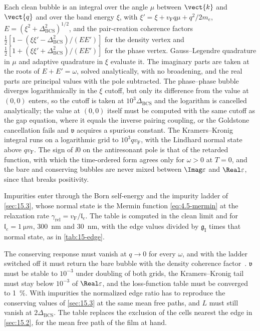 Each clean bubble is an integral over the angle $\mu$ between $\vect{k}$ and $\vect{q}$ and over the band energy $\xi$, with $\xi' = \xi + v_{\mathrm{F}}q\mu + q^2/2m_e$, $E = (\xi^2 + \Delta_{\mathrm{BCS}}^2)^{1/2}$, and the pair-creation coherence factors $\frac12[1 - (\xi\xi' - \Delta_{\mathrm{BCS}}^2)/(EE')]$ for the density vertex and $\frac12[1 + (\xi\xi' + \Delta_{\mathrm{BCS}}^2)/(EE')]$ for the phase vertex. Gauss--Legendre quadrature in $\mu$ and adaptive quadrature in $\xi$ evaluate it. The imaginary parts are taken at the roots of $E + E' = \omega$, solved analytically, with no broadening, and the real parts are principal values with the pole subtracted. The phase--phase bubble diverges logarithmically in the $\xi$ cutoff, but only its difference from the value at $(0,0)$ enters, so the cutoff is taken at $10^3\Delta_{\mathrm{BCS}}$ and the logarithm is cancelled analytically; the value at $(0,0)$ itself must be computed with the same cutoff as the gap equation, where it equals the inverse pairing coupling, or the Goldstone cancellation fails and $\mathfrak{v}$ acquires a spurious constant. The Kramers--Kronig integral runs on a logarithmic grid to $10^3qv_{\mathrm{F}}$, with the Lindhard normal state above $qv_{\mathrm{F}}$. The sign of $\ii0$ on the antiresonant pole is that of the retarded function, with which the time-ordered form agrees only for $\omega > 0$ at $T = 0$, and the bare and conserving bubbles are never mixed between $\Imag\varepsilon$ and $\Real\varepsilon$, since that breaks positivity.

Impurities enter through the Born self-energy and the impurity ladder of \cref{sec:15.3}, whose normal state is the Mermin function \cref{eq:4.5-mermin} at the relaxation rate $\gamma_{\mathrm{rel}} = v_{\mathrm{F}}/\mathfrak{l}_e$. The table is computed in the clean limit and for $\mathfrak{l}_e = \SI{1}{\micro m}$, \SI{300}{nm} and \SI{30}{nm}, with the edge values divided by $\mathfrak{g}_{\mathrm{I}}$ times that normal state, as in \cref{tab:15-edge}.

The conserving response must vanish at $q \to 0$ for every $\omega$, and with the ladder switched off it must return the bare bubble with the density coherence factor~\cite[Eq.~(7)]{gan2026mean}. $\mathfrak{v}$ must be stable to $10^{-3}$ under doubling of both grids, the Kramers--Kronig tail must stay below $10^{-3}$ of $\Real\varepsilon$, and the loss-function table must be converged to \SI{1}{\percent}. With impurities the normalized edge ratio has to reproduce the conserving values of \cref{sec:15.3} at the same mean free paths, and $L$ must still vanish at $2\Delta_{\mathrm{BCS}}$. The table replaces the exclusion of the cells nearest the edge in \cref{sec:15.2}, for the mean free path of the film at hand.

